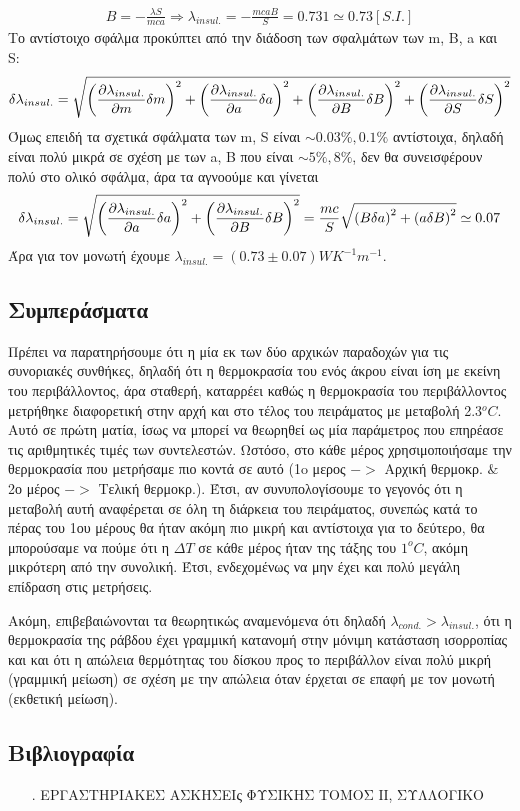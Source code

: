 \documentclass[a4paper]{article}
\begin{document}
\begin{align*} 
B=-\frac{\lambda S}{mca} \Rightarrow \lambda_{insul.} = - \frac{mcaB}{S} = 0.731 \simeq 0.73      [S.I.]
\end{align*}
Το αντίστοιχο σφάλμα προκύπτει από την διάδοση των σφαλμάτων των m, B, a και S: 
\begin{align*}
\delta \lambda_{insul.} = \sqrt{\left(\pdv{\lambda_{insul.}}{m} \delta m \right)^2+ 
			\left( \pdv{\lambda_{insul.}}{a} \delta a\right)^2 + \left( \pdv{\lambda_{insul.}}{B} \delta B\right)^2+ \left( \pdv{\lambda_{insul.}}{S} \delta S\right)^2} 
\end{align*}
Όμως επειδή τα σχετικά σφάλματα των m, S είναι $\sim 0.03\%, 0.1\%$ αντίστοιχα, δηλαδή είναι πολύ μικρά σε σχέση με των a, B που είναι $\sim 5\%, 8\%$, δεν θα συνεισφέρουν πολύ στο ολικό σφάλμα, άρα τα αγνοούμε και γίνεται
\begin{align*}
\delta \lambda_{insul.} =  \sqrt{ \left( \pdv{\lambda_{insul.}}{a} \delta a\right)^2 + \left( \pdv{\lambda_{insul.}}{B} \delta B								\right)^2}  = 
\frac{mc}{S}\sqrt{\left( B\delta a\right)^2 + \left( a \delta B\right)^2}	\simeq 	 0.07 
\end{align*}
Άρα για τον μονωτή έχουμε $\boxed{\lambda_{insul.}=(0.73\pm0.07)WK^{-1}m^{-1}}$.

\subsection*{Συμπεράσματα}
Πρέπει να παρατηρήσουμε ότι η μία εκ των δύο αρχικών παραδοχών για τις συνοριακές συνθήκες, δηλαδή ότι η θερμοκρασία του ενός άκρου είναι ίση με εκείνη του περιβάλλοντος, άρα σταθερή, καταρρέει καθώς η θερμοκρασία του περιβάλλοντος μετρήθηκε διαφορετική στην αρχή και στο τέλος του πειράματος με μεταβολή 2.3$^oC$. Αυτό σε πρώτη ματία, ίσως να μπορεί να θεωρηθεί ως μία παράμετρος που επηρέασε τις αριθμητικές τιμές των συντελεστών. 
Ωστόσο, στο κάθε μέρος χρησιμοποιήσαμε την θερμοκρασία που μετρήσαμε πιο κοντά σε αυτό (1o μερος $->$ Αρχική θερμοκρ. $\&$ 2ο μέρος $->$ Τελική θερμοκρ.). Έτσι, αν συνυπολογίσουμε το γεγονός ότι η μεταβολή αυτή αναφέρεται σε όλη τη διάρκεια του πειράματος, συνεπώς κατά το πέρας του 1ου μέρους θα ήταν ακόμη πιο μικρή και αντίστοιχα για το δεύτερο, θα μπορούσαμε να πούμε ότι η $\Delta T$ σε κάθε μέρος ήταν της τάξης του $1^oC$, ακόμη μικρότερη από την συνολική. Έτσι, ενδεχομένως να μην έχει και πολύ μεγάλη επίδραση στις μετρήσεις.

Ακόμη, επιβεβαιώνονται τα θεωρητικώς αναμενόμενα ότι δηλαδή $\lambda_{cond.}>\lambda_{insul.}$, ότι η θερμοκρασία της ράβδου έχει γραμμική κατανομή στην μόνιμη κατάσταση ισορροπίας και και ότι η απώλεια θερμότητας του δίσκου προς το περιβάλλον είναι πολύ μικρή (γραμμική μείωση) σε σχέση με την απώλεια όταν έρχεται σε επαφή με τον μονωτή (εκθετική μείωση).
\subsection*{Βιβλιογραφία}
\begin{itemize}
\item[.] ΕΡΓΑΣΤΗΡΙΑΚΕΣ ΑΣΚΗΣΕΙς ΦΥΣΙΚΗΣ ΤΟΜΟΣ ΙΙ, ΣΥΛΛΟΓΙΚΟ
\end{itemize}
\end{document}
